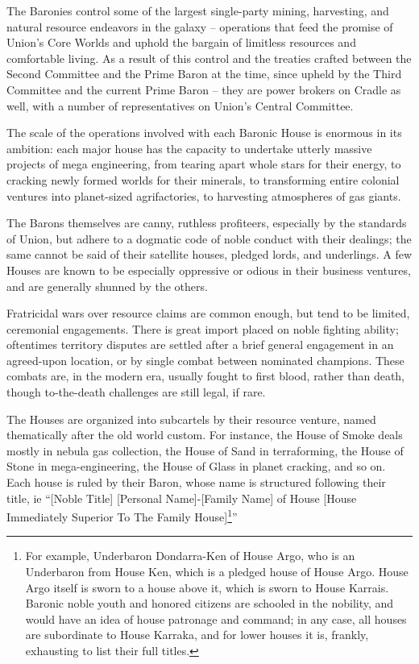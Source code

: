 The Baronies control some of the largest single-party mining, harvesting, and natural resource
endeavors in the galaxy -- operations that feed the promise of Union’s Core Worlds and uphold
the bargain of limitless resources and comfortable living. As a result of this control and the
treaties crafted between the Second Committee and the Prime Baron at the time, since upheld
by the Third Committee and the current Prime Baron -- they are power brokers on Cradle as well,
with a number of representatives on Union’s Central Committee.

The scale of the operations involved with each Baronic House is enormous in its ambition: each
major house has the capacity to undertake utterly massive projects of mega engineering, from
tearing apart whole stars for their energy, to cracking newly formed worlds for their minerals, to
transforming entire colonial ventures into planet-sized agrifactories, to harvesting atmospheres of
gas giants.

The Barons themselves are canny, ruthless profiteers, especially by the standards of Union, but
adhere to a dogmatic code of noble conduct with their dealings; the same cannot be said of their
satellite houses, pledged lords, and underlings. A few Houses are known to be especially
oppressive or odious in their business ventures, and are generally shunned by the others.

Fratricidal wars over resource claims are common enough, but tend to be limited, ceremonial
engagements. There is great import placed on noble fighting ability; oftentimes territory disputes
are settled after a brief general engagement in an agreed-upon location, or by single combat
between nominated champions. These combats are, in the modern era, usually fought to first
blood, rather than death, though to-the-death challenges are still legal, if rare.

The Houses are organized into subcartels by their resource venture, named thematically after the
old world custom. For instance, the House of Smoke deals mostly in nebula gas collection, the
House of Sand in terraforming, the House of Stone in mega-engineering, the House of Glass in
planet cracking, and so on. Each house is ruled by their Baron, whose name is structured
following their title, ie “[Noble Title] [Personal Name]-[Family Name] of House [House Immediately
Superior To The Family House]\footnote{For example, Underbaron Dondarra-Ken of House Argo, who is an Underbaron from House Ken, which is
a pledged house of House Argo. House Argo itself is sworn to a house above it, which is sworn to House
Karrais. Baronic noble youth and honored citizens are schooled in the nobility, and would have an idea of
house patronage and command; in any case, all houses are subordinate to House Karraka, and for lower
houses it is, frankly, exhausting to list their full titles.}”

